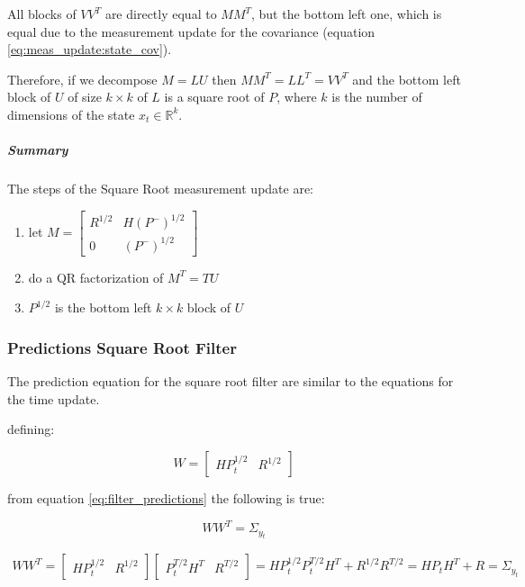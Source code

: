 \documentclass{article}
\begin{document}
All blocks of $VV^T$ are directly equal to $MM^T$, but the bottom left one, which is equal due to the measurement update for the covariance (equation \ref{eq:meas_update:state_cov}).

Therefore, if we decompose $M=LU$ then $MM^T=LL^T=VV^T$ and the bottom left block of $U$ of size $k \times k$ of $L$ is a square root of $P$, where $k$ is the number of dimensions of the state $x_t \in \mathbb{R}^k$.

\subparagraph{Summary} The steps of the Square Root measurement update are:
\begin{enumerate}
 \item let $M = \begin{bmatrix} R^{1/2} & H(P^-)^{1/2} \\ 0 & (P^-)^{1/2} \end{bmatrix}$
 \item do a QR factorization of $M^T=TU$
 \item $P^{1/2}$ is the bottom left $k \times k$ block of $U$
\end{enumerate}

\subsubsection{Predictions Square Root Filter}

The prediction equation for the square root filter are similar to the equations for the time update.

defining:

\begin{equation}
    W = \begin{bmatrix}HP_{t}^{1/2} & R^{1/2}\end{bmatrix}
\end{equation}

from equation \ref{eq:filter_predictions} the following is true:

\begin{equation}\label{predict_SR_mult}
WW^T = \Sigma_{y_t} 
\end{equation}

\begin{multline}
  WW^T =  \begin{bmatrix}HP_{t}^{1/2} & R^{1/2}\end{bmatrix}\begin{bmatrix}P_{t}^{T/2}H^T & R^{T/2}\end{bmatrix}
  = HP_{t}^{1/2}P_{t}^{T/2}H^T + R^{1/2}R^{T/2} = HP_{t}H^T + R = \Sigma_{y_t}
\end{multline}
\end{document}
